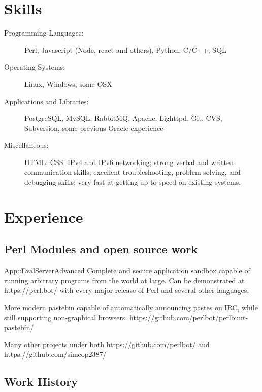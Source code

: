 \documentclass[table,tmargin=1in,bmargin=1in,letterpaper]{resume}
\author{Ryan Voots}
\begin{document}
\maketitle
\vspace{0.1in}

\section{Skills}
\begin{description}
\item[Programming Languages:]
Perl, Javascript (Node, react and others), Python, C/C++, SQL
\item[Operating Systems:]
Linux, Windows, some OSX
\item[Applications and Libraries:]
PostgreSQL, MySQL, RabbitMQ, Apache, Lighttpd, Git, CVS, Subversion, some previous Oracle experience
\item[Miscellaneous:]
HTML; CSS; IPv4 and IPv6 networking; strong verbal and written communication skills; excellent troubleshooting, problem solving, and debugging skills; very fast at getting up to speed on existing systems.
\end{description}

\section{Experience}

\subsection{Perl Modules and open source work}
\begin{compactitem}
\item App::EvalServerAdvanced
Complete and secure application sandbox capable of running arbitrary programs from the world at large.  Can be demonstrated at https://perl.bot/ with every major release of Perl and several other languages.
\item More modern pastebin capable of automatically announcing pastes on IRC, while still supporting non-graphical browsers.  https://github.com/perlbot/perlbuut-pastebin/
\item Many other projects under both https://github.com/perlbot/ and https://github.com/simcop2387/
\end{compactitem}

\subsection{Work History}
\end{document}

